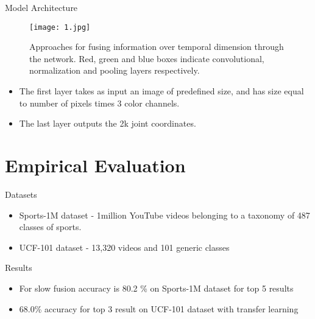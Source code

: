 \documentclass[pdf]{beamer}
\begin{document}
    
    \begin{frame}{Model Architecture}
        \begin{figure}
            \centering
            \label{fig:single_frame}
            \label{fig:late}
            \label{fig:early}
            \label{fig:slow}
            \texttt{[image: 1.jpg]}
            \caption{ Approaches for fusing information over
temporal dimension through the network. Red, green and
blue boxes indicate convolutional, normalization and pooling layers respectively.}
            
        \end{figure}
        \begin{itemize}
            \item The first layer takes as input an image of predefined size, and has size equal to number of pixels times 3 color channels.
            \item The last layer outputs the 2k joint coordinates.
        \end{itemize}
    \end{frame}
    
    \section{Empirical Evaluation}
    \begin{frame}{Datasets}
        \begin{itemize}
            \item Sports-1M dataset - 1million YouTube videos belonging to a taxonomy of 487 classes of sports.
            \item UCF-101 dataset - 13,320 videos and 101 generic classes
        \end{itemize}
    \end{frame}
    \begin{frame}{Results}
        \begin{itemize}
    
            \item For slow fusion accuracy is  80.2 \% on Sports-1M dataset for top 5 results
            \item 68.0\% accuracy for top 3 result on UCF-101 dataset with transfer learning
        \end{itemize}
    \end{frame}
    
\end{document}

